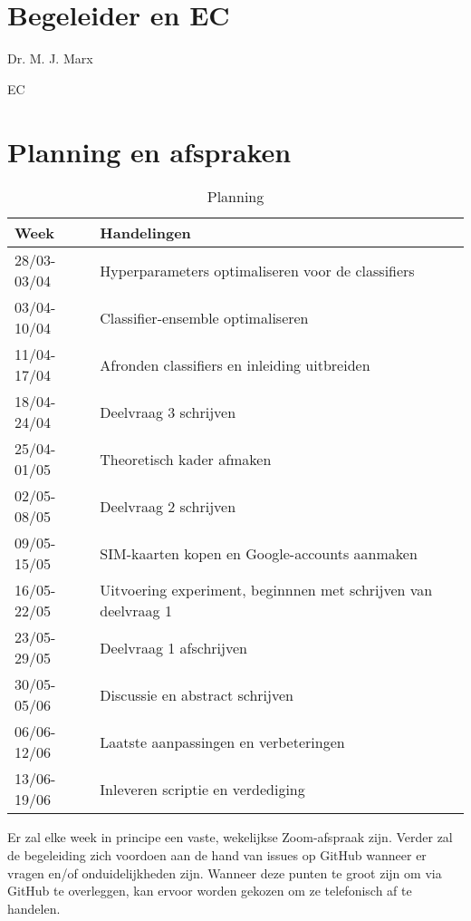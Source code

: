 \documentclass{uva-inf-article}
\begin{document}
\section{Begeleider en EC}
Dr. M. J. Marx

 EC

\newpage
\section{Planning en afspraken}

\begin{table}[!b]
\centering
\caption{Planning}
\label{tab:my-table}
\begin{tabular}{@{}ll@{}}
\toprule
Week        & Handelingen                                                    \\ \midrule
28/03-03/04 & Hyperparameters optimaliseren voor de classifiers              \\
03/04-10/04 & Classifier-ensemble optimaliseren                              \\
11/04-17/04 & Afronden classifiers en inleiding uitbreiden                   \\
18/04-24/04 & Deelvraag 3 schrijven                                          \\
25/04-01/05 & Theoretisch kader afmaken                                      \\
02/05-08/05 & Deelvraag 2 schrijven                                          \\
09/05-15/05 & SIM-kaarten kopen en Google-accounts aanmaken                  \\
16/05-22/05 & Uitvoering experiment, beginnnen met schrijven van deelvraag 1 \\
23/05-29/05 & Deelvraag 1 afschrijven                                        \\
30/05-05/06 & Discussie en abstract schrijven                                \\
06/06-12/06 & Laatste aanpassingen en verbeteringen                          \\
13/06-19/06 & Inleveren scriptie en verdediging                              \\ \bottomrule
\end{tabular}
\end{table}


Er zal elke week in principe een vaste, wekelijkse Zoom-afspraak zijn. Verder zal de begeleiding zich voordoen aan de hand van issues op GitHub wanneer er vragen en/of onduidelijkheden zijn. Wanneer deze punten te groot zijn om via GitHub te overleggen, kan ervoor worden gekozen om ze telefonisch af te handelen. 

\newpage

 
\end{document}
